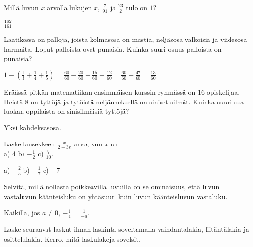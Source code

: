 \begin{tehtavasivu}
\begin{tehtava}
Millä luvun $x$ arvolla lukujen $x$, $\frac{7}{91}$ ja $\frac{23}{2}$ tulo on $1$?
\begin{vastaus}
$\frac{182}{161}$
\end{vastaus}
\end{tehtava}

\begin{tehtava} 
        Laatikossa on palloja, joista kolmasosa on mustia, neljäsosa
        valkoisia ja viidesosa harmaita. Loput palloista ovat 		 	punaisia.
        Kuinka suuri osuus palloista on punaisia?
        
        \begin{vastaus}
            $1-(\frac{1}{3}+\frac{1}{4}+\frac{1}{5})
            = \frac{60}{60}-\frac{20}{60}-\frac{15}{60}-\frac{12}{60}
            = \frac{60}{60}-\frac{47}{60}
            = \frac{13}{60}$
        \end{vastaus}
    \end{tehtava}
    
\begin{tehtava} 
Eräässä pitkän matematiikan ensimmäisen kurssin ryhmässä on 16 opiskelijaa. Heistä 8 on tyttöjä ja tytöistä neljänneksellä on siniset silmät. Kuinka suuri osa luokan oppilaista on sinisilmäisiä tyttöjä?
        \begin{vastaus}
			Yksi kahdeksasosa.
        \end{vastaus}
\end{tehtava}

\begin{tehtava}
Laske lausekkeen $\frac{x}{2-3x}$ arvo, kun $x$ on \\ a) 4 \qquad b) $-\frac{1}{2}$ \qquad c) $\frac{7}{10}$.
\begin{vastaus}
a) $-\frac{2}{5}$ \qquad b) $-\frac{1}{7}$ \qquad c) $-7$
\end{vastaus}
\end{tehtava}

\begin{tehtava}
Selvitä, millä nollasta poikkeavilla luvuilla on se ominaisuus, että luvun vastaluvun käänteisluku on yhtäsuuri kuin luvun käänteisluvun vastaluku.
\begin{vastaus}
Kaikilla, jos $a \neq 0$, $-\frac{1}{a} = \frac{1}{-a}$.
\end{vastaus}
\end{tehtava}

\begin{tehtava}
Laske seuraavat laskut ilman laskinta soveltamalla vaihdantalakia, liitäntälakia ja osittelulakia.
Kerro, mitä laskulakeja sovelsit.


\end{tehtava}
\end{tehtavasivu}
